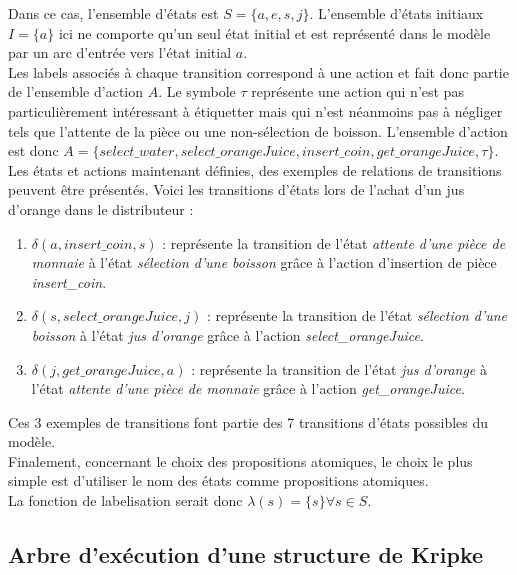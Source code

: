 \documentclass[runningheads,a4paper,10pt]{llncs}
\begin{document}
\noindent
Dans ce cas, l'ensemble d'états est $S = \{a, e, s, j\}$. L'ensemble d'états initiaux $I = \{a\}$ ici ne comporte qu'un seul état initial et est représenté dans le modèle par un arc d'entrée vers l'état initial $a$. \\

\noindent
Les labels associés à chaque transition correspond à une action et fait donc partie de l'ensemble d'action $A$. Le symbole $\tau$ représente une action qui n'est pas particulièrement intéressant à étiquetter mais qui n'est néanmoins pas à négliger tels que l'attente de la pièce ou une non-sélection de boisson. L'ensemble d'action est donc $A = \{select\_water, select\_orangeJuice, insert\_coin, get\_orangeJuice, \tau\}$. \\

\noindent
Les états et actions maintenant définies, des exemples de relations de transitions peuvent être présentés. Voici les transitions d'états lors de l'achat d'un jus d'orange dans le distributeur : 

\begin{enumerate}
\item \boldmath$\delta(a,insert\_coin,s)$ : représente la transition de l'état \textit{attente d'une pièce de monnaie} à l'état \textit{sélection d'une boisson} grâce à l'action d'insertion de pièce \textit{insert\_coin}. 
\item \boldmath$\delta(s,select\_orangeJuice,j)$ : représente la transition de l'état \textit{sélection d'une boisson} à l'état \textit{jus d'orange} grâce à l'action \textit{select\_orangeJuice}. 
\item \boldmath$\delta(j,get\_orangeJuice,a)$ : représente la transition de l'état \textit{jus d'orange} à l'état \textit{attente d'une pièce de monnaie} grâce à l'action \textit{get\_orangeJuice}.
\end{enumerate} 

Ces 3 exemples de transitions font partie des 7 transitions d'états possibles du modèle. \\

\noindent
Finalement, concernant le choix des propositions atomiques, le choix le plus simple est d'utiliser le nom des états comme propositions atomiques.\\
La fonction de labelisation serait donc $\lambda(s) = \{s\}  \forall s \in S$.  

\subsection{Arbre d'exécution d'une structure de Kripke}
\end{document}
